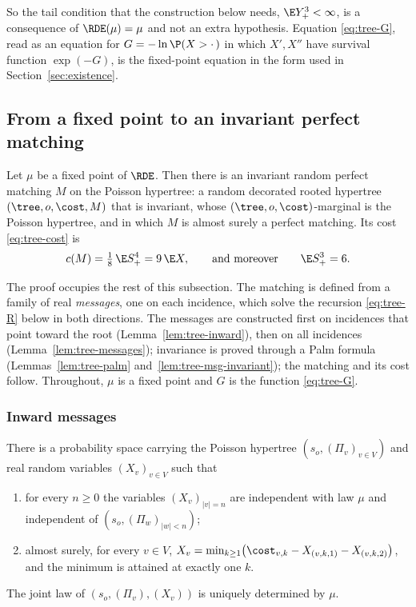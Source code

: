 So the tail condition that the construction below needs, $\E Y_+^3<\infty$, is a consequence
of $\RDE(\mu)=\mu$ and not an extra hypothesis. Equation \eqref{eq:tree-G}, read as an
equation for $G=-\ln\P(X>\cdot\,)$ in which $X',X''$ have survival function $\exp(-G)$, is
the fixed-point equation in the form used in Section~\ref{sec:existence}.

\subsection{From a fixed point to an invariant perfect matching}\label{subsec:tree-process}

\begin{theorem}\label{thm:process}
Let $\mu$ be a fixed point of $\RDE$. Then there is an invariant random perfect matching $M$
on the Poisson hypertree: a random decorated rooted hypertree $(\tree,o,\cost,M)$ that is
invariant, whose $(\tree,o,\cost)$-marginal is the Poisson hypertree, and in which $M$ is
almost surely a perfect matching. Its cost \eqref{eq:tree-cost} is
\[
  c(M)=\tfrac18\,\E S_+^4=9\,\E X ,\qquad\text{and moreover}\qquad \E S_+^3=6 .
\]
\end{theorem}

The proof occupies the rest of this subsection. The matching is defined from a family of
real \emph{messages}, one on each incidence, which solve the recursion \eqref{eq:tree-R}
below in both directions. The messages are constructed first on incidences that point toward
the root (Lemma~\ref{lem:tree-inward}), then on all incidences
(Lemma~\ref{lem:tree-messages}); invariance is proved through a Palm formula
(Lemmas~\ref{lem:tree-palm} and~\ref{lem:tree-msg-invariant}); the matching and its cost
follow. Throughout, $\mu$ is a fixed point and $G$ is the function \eqref{eq:tree-G}.

\subsubsection*{Inward messages}

\begin{lemma}\label{lem:tree-inward}
There is a probability space carrying the Poisson hypertree $(s_o,(\Pi_v)_{v\in V})$ and real
random variables $(X_v)_{v\in V}$ such that
\begin{enumerate}
\item[(a)] for every $n\ge0$ the variables $(X_v)_{|v|=n}$ are independent with law $\mu$ and
independent of $(s_o,(\Pi_w)_{|w|<n})$;
\item[(b)] almost surely, for every $v\in V$,
$X_v=\min_{k\ge1}\bigl(\cost_{v,k}-X_{(v,k,1)}-X_{(v,k,2)}\bigr)$, and the minimum is attained
at exactly one $k$.
\end{enumerate}
The joint law of $(s_o,(\Pi_v),(X_v))$ is uniquely determined by $\mu$.
\end{lemma}

